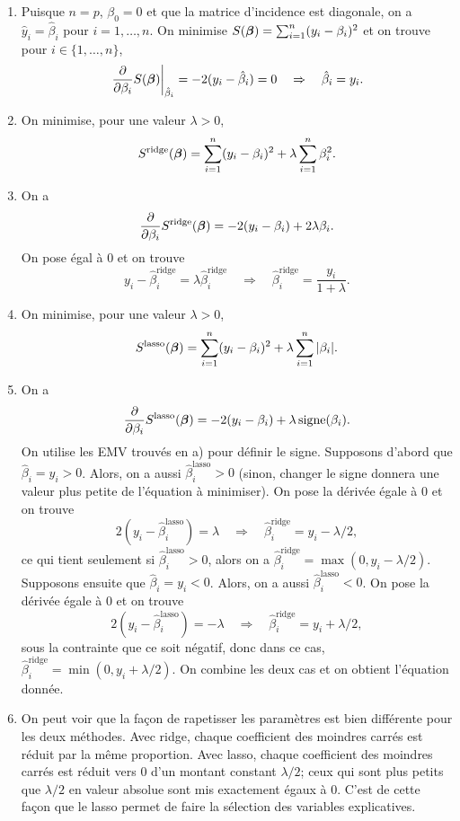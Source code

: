 \begin{solution}{4.2}
\begin{enumerate}
\item Puisque $n=p$, $\beta_0=0$ et que la matrice d'incidence est diagonale, on a $\hat{y}_i = \hat\beta_i$ pour $i=1,\ldots,n$. On minimise $S(\mbox{\boldmath$\beta$})=\sum_{i=1}^n (y_i-\beta_i)^2$ et on trouve pour $i\in \{1,\ldots,n\}$,
$$
\left.\frac{\partial}{\partial\beta_i}S(\mbox{\boldmath$\beta$})\right|_{\hat\beta_i}= -2 (y_i-\hat\beta_i) =0 \quad \Rightarrow \quad \hat\beta_i =  y_i.
$$

\item On minimise, pour une valeur $\lambda>0$,
$$
S^{\mathrm{ridge}}(\mbox{\boldmath$\beta$})=\sum_{i=1}^n (y_i-\beta_i)^2 +\lambda \sum_{i=1}^n \beta_i^2.
$$

\item On a
$$
\frac{\partial}{\partial\beta_i}S^{\mathrm{ridge}}(\mbox{\boldmath$\beta$})=-2(y_i-\beta_i) +2 \lambda  \beta_i.
$$
On pose égal à 0 et on trouve
$$
y_i-\hat \beta_i^{\mathrm{ridge}} = \lambda  \hat\beta_i^{\mathrm{ridge}} \quad \Rightarrow \quad \hat\beta_i^{\mathrm{ridge}} =  \frac{y_i}{1+\lambda}.
$$

\item On minimise, pour une valeur $\lambda>0$,
$$
S^{\mathrm{lasso}}(\mbox{\boldmath$\beta$})=\sum_{i=1}^n (y_i-\beta_i)^2 +\lambda \sum_{i=1}^n |\beta_i|.
$$

\item On a
$$
\frac{\partial}{\partial\beta_i}S^{\mathrm{lasso}}(\mbox{\boldmath$\beta$})=-2(y_i-\beta_i) + \lambda\, \mathrm{signe}(\beta_i) .
$$
On utilise les EMV trouvés en a) pour définir le signe. Supposons d'abord que $\hat\beta_i = y_i>0$. Alors, on a aussi $\hat\beta_i^{\mathrm{lasso}}>0$ (sinon, changer le signe donnera une valeur plus petite de l'équation à minimiser). On pose la dérivée égale à 0 et on trouve
$$
2(y_i-\hat \beta_i^{\mathrm{lasso}}) = \lambda  \quad \Rightarrow \quad \hat\beta_i^{\mathrm{ridge}} =  y_i- \lambda/2,
$$
ce qui tient seulement si $\hat\beta_i^{\mathrm{lasso}}>0$, alors on a $\hat\beta_i^{\mathrm{ridge}} =  \max(0,y_i- \lambda/2)$.
Supposons ensuite que $\hat \beta_i = y_i <0$. Alors, on a aussi $\hat\beta_i^{\mathrm{lasso}}<0$. On pose la dérivée égale à 0 et on trouve
$$
2(y_i-\hat \beta_i^{\mathrm{lasso}}) = -\lambda  \quad \Rightarrow \quad \hat\beta_i^{\mathrm{ridge}} =  y_i+ \lambda/2,
$$
sous la contrainte que ce soit négatif, donc dans ce cas, $\hat\beta_i^{\mathrm{ridge}} =  \min(0,y_i+\lambda/2)$. On combine les deux cas et on obtient l'équation donnée.

\item On peut voir que la façon de rapetisser les paramètres est bien différente pour les deux méthodes. Avec ridge, chaque coefficient des moindres carrés est réduit par la même proportion. Avec lasso, chaque coefficient des moindres carrés est réduit vers 0 d'un montant constant $\lambda/2$; ceux qui sont plus petits que $\lambda/2$ en valeur absolue sont mis exactement égaux à 0. C'est de cette façon que le lasso permet de faire la sélection des variables explicatives.

\end{enumerate}
\end{solution}
